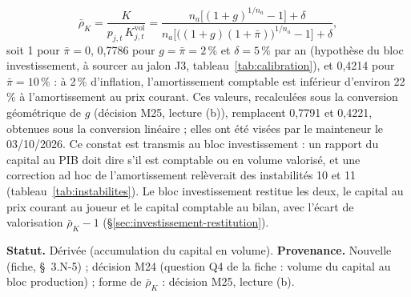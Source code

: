 \documentclass[11pt,a4paper]{article}
\begin{document}
\begin{equation*}
\bar\rho_K = \frac{K}{p_{j,t}\, K^{\mathrm{vol}}_{j,t}} = \frac{n_a\bigl[(1 + g)^{1/n_a} - 1\bigr] + \delta}{n_a\bigl[\bigl((1 + g)(1 + \bar\pi)\bigr)^{1/n_a} - 1\bigr] + \delta} ,
\end{equation*}
soit 1 pour $\bar\pi = 0$, 0,7786 pour $g = \bar\pi = 2\,\%$ et $\delta = 5\,\%$ par an (hypothèse du bloc investissement, à sourcer au jalon J3, tableau~\ref{tab:calibration}), et 0,4214 pour $\bar\pi = 10\,\%$ : à 2\,\% d'inflation, l'amortissement comptable est inférieur d'environ 22\,\% à l'amortissement au prix courant. Ces valeurs, recalculées sous la conversion géométrique de $g$ (décision M25, lecture (b)), remplacent 0,7791 et 0,4221, obtenues sous la conversion linéaire ; elles ont été visées par le mainteneur le 03/10/2026. Ce constat est transmis au bloc investissement : un rapport du capital au PIB doit dire s'il est comptable ou en volume valorisé, et une correction ad hoc de l'amortissement relèverait des instabilités 10 et 11 (tableau~\ref{tab:instabilites}). Le bloc investissement restitue les deux, le capital au prix courant au joueur et le capital comptable au bilan, avec l'écart de valorisation $\bar\rho_K - 1$ (\S\ref{sec:investissement-restitution}).

\textbf{Statut.} Dérivée (accumulation du capital en volume). \textbf{Provenance.} Nouvelle (fiche, \S~3.N-5) ; décision M24 (question Q4 de la fiche : volume du capital au bloc production) ; forme de $\bar\rho_K$ : décision M25, lecture (b).
\end{document}
